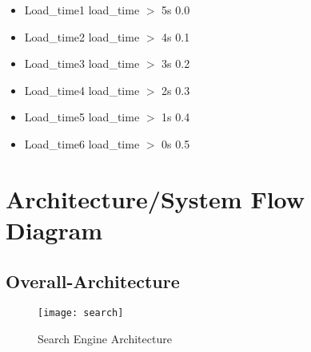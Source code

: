 \documentclass{scrreprt}
\begin{document}
\begin{itemize}

    
  \item Load_time1 \hspace{15pt} load_time $>$ 5s \hspace{15pt} 0.0
  \item Load_time2 \hspace{15pt} load_time $>$ 4s \hspace{15pt} 0.1
  \item Load_time3 \hspace{15pt} load_time $>$ 3s \hspace{15pt} 0.2
  \item Load_time4 \hspace{15pt} load_time $>$ 2s \hspace{15pt} 0.3
  \item Load_time5 \hspace{15pt} load_time $>$ 1s \hspace{15pt} 0.4
  \item Load_time6 \hspace{15pt} load_time $>$ 0s \hspace{15pt} 0.5
  
  
  
\end{itemize}


    



\chapter{Architecture/System Flow Diagram}

\section{Overall-Architecture}

\begin{figure}[h]
\begin{center}
\texttt{[image: search]}
\caption{Search Engine Architecture}
\end{center}
\end{figure}  
\end{document}
